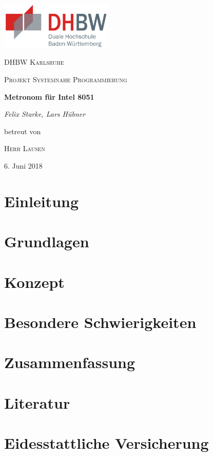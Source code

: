 \documentclass[a4paper, 10pt]{scrartcl}
\title{\titel}
\author{\autoren}
\date{\datum}
\def \autoren {Felix Starke, Lars Hübner}
\def \titel {Metronom für Intel 8051}
\def \arbeit {Projekt Systemnahe Programmierung}
\def \uni {DHBW Karlsruhe}
\def \betreuer {Herr Lausen}
\def \datum {6. Juni 2018}
\begin{document}
\begin{titlepage}
	\centering
	\includegraphics[width=0.4\textwidth]{dhbw.png}\par\vspace{1cm}
	{\scshape\LARGE \uni \par}
	\vspace{1cm}
	{\scshape\Large \arbeit\par}
	\vspace{1.5cm}
	{\huge\bfseries \titel\par}
	\vspace{2cm}
	{\Large\itshape \autoren\par}
	\vfill
	betreut von\par
	\textsc{\betreuer}

	\vfill

	{\large \datum\par}
\end{titlepage}

\newpage
\tableofcontents
\newpage

\section{Einleitung}
\section{Grundlagen}
\section{Konzept}
\section{Besondere Schwierigkeiten}
\section{Zusammenfassung}
\section{Literatur}
\section{Eidesstattliche Versicherung}
\end{document}
